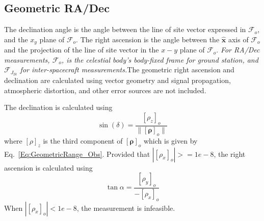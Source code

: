 
\subsection{Geometric RA/Dec}

The declination angle is the angle between the line of site vector
expressed in $\mathcal{F}_o$, and the $x_y$ plane of
$\mathcal{F}_o$. The right ascension is the angle between the
$\hat{\mathbf{x}}$ axis of $\mathcal{F}_o$ and the projection of the
line of site vector in the $x-y$ plane of $\mathcal{F}_o$.
\textit{For RA/Dec measurements, $\mathcal{F}_o$, is the celestial
body's body-fixed frame for ground station, and
$\mathcal{F}_{J_{2k}}$ for inter-spacecraft measurements.}The
geometric right ascension and declination are calculated using
vector geometry and signal propagation, atmospheric distortion, and
other error sources are not included.

The declination is  calculated using
%
\begin{equation}
\sin(\delta) = \frac{ \left[ \rho_z \right]_o }{ \| \left[\boldsymbol{\rho}\right]_o \|}
\end{equation}
%
where $[\rho]_z$ is the third component of $[\boldsymbol{\rho}]_o$
which is given by Eq.~\ref{Eq:GeometricRange_Obs}. Provided that
$\left|[\rho_x]_o \right| >= 1e-8$, the right ascension is calculated using
%
\begin{equation}
\tan{\alpha} = \frac{\left[ \rho_y \right]_o}{-\left[ \rho_x \right]_o}
\end{equation}
%
When $|[\rho_x]_o| < 1e-8$, the measurement is infeasible.


